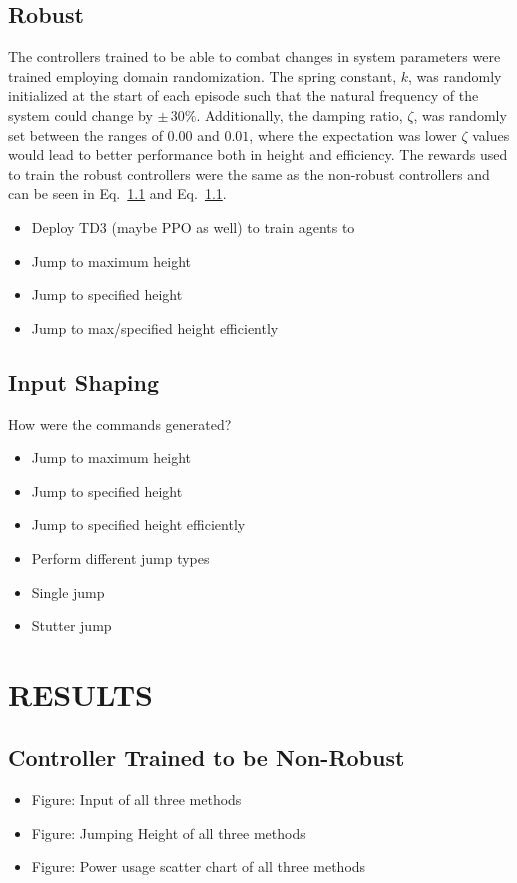 \documentclass[letterpaper, 10 pt, conference]{ieeeconf}  %
\begin{document}
\subsection{Robust}
The controllers trained to be able to combat changes in system parameters were trained employing domain randomization. The spring constant, $k$, was randomly initialized at the start of each episode such that the natural frequency of the system could change by $\pm\,30 \%$. Additionally, the damping ratio, $\zeta$, was randomly set between the ranges of $0.00$ and $0.01$, where the expectation was lower $\zeta$ values would lead to better performance both in height and efficiency. The rewards used to train the robust controllers were the same as the non-robust controllers and can be seen in Eq.~\ref{} and Eq.~\ref{}. 

\begin{itemize}
        \item Deploy TD3 (maybe PPO as well) to train agents to
        \item Jump to maximum height
        \item Jump to specified height
        \item Jump to max/specified height efficiently
\end{itemize}

\subsection{Input Shaping}
How were the commands generated?

\begin{itemize}
        \item Jump to maximum height
        \item Jump to specified height
        \item Jump to specified height efficiently
        \item Perform different jump types
        \item Single jump
        \item Stutter jump
\end{itemize}


\section{RESULTS}
\subsection{Controller Trained to be Non-Robust}
\begin{itemize}
        \item Figure: Input of all three methods
        \item Figure: Jumping Height of all three methods
        \item Figure: Power usage scatter chart of all three methods
\end{itemize}
\end{document}
